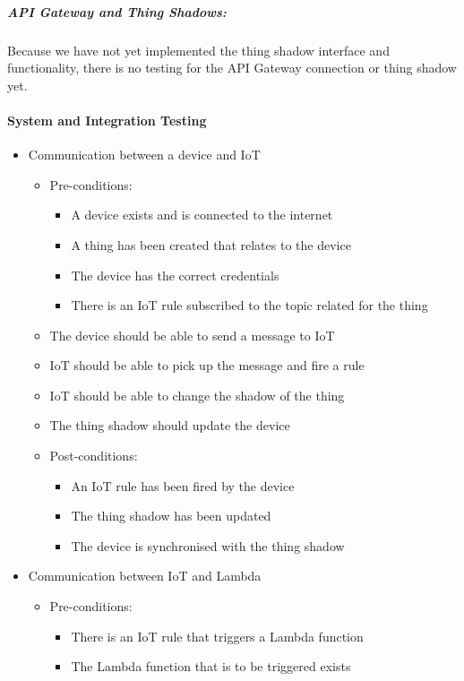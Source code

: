\documentclass{article}
\begin{document}
	\subparagraph{API Gateway and Thing Shadows:}
	Because we have not yet implemented the thing shadow interface and functionality, there is no testing for the API Gateway connection or thing shadow yet.
	
	\paragraph{System and Integration Testing}
	\begin{itemize}
		\item{Communication between a device and IoT}
		\begin{itemize}
			\item Pre-conditions: 
			\begin{itemize}
				\item A device exists and is connected to the internet
				\item A thing has been created that relates to the device
				\item The device has the correct credentials
				\item There is an IoT rule subscribed to the topic related for the thing
			\end{itemize}
			\item The device should be able to send a message to IoT
			\item IoT should be able to pick up the message and fire a rule
			\item IoT should be able to change the shadow of the thing
			\item The thing shadow should update the device
			\item Post-conditions:
			\begin{itemize}
				\item An IoT rule has been fired by the device
				\item The thing shadow has been updated
				\item The device is synchronised with the thing shadow
			\end{itemize}
		\end{itemize}
		\item{Communication between IoT and Lambda}
		\begin{itemize}
			\item Pre-conditions: 
			\begin{itemize}
				\item There is an IoT rule that triggers a Lambda function
				\item The Lambda function that is to be triggered exists

\end{itemize}
\end{itemize}
\end{itemize}
\end{document}
